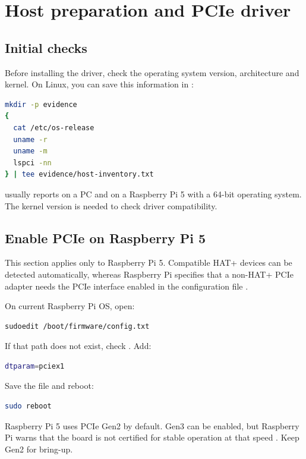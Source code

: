 \chapter{Host preparation and PCIe driver}
\label{chap:host-driver}

\section{Initial checks}

Before installing the driver, check the operating system version, architecture and
kernel. On Linux, you can save this information in :

\begin{lstlisting}[language=bash]
mkdir -p evidence
{
  cat /etc/os-release
  uname -r
  uname -m
  lspci -nn
} | tee evidence/host-inventory.txt
\end{lstlisting}

 usually reports  on a PC and  on a
Raspberry Pi 5 with a 64-bit operating system. The kernel version is needed to check
driver compatibility.

\section{Enable PCIe on Raspberry Pi 5}

This section applies only to Raspberry Pi 5. Compatible HAT+ devices can be detected
automatically, whereas Raspberry Pi specifies that a non-HAT+ PCIe adapter needs the
PCIe interface enabled in the configuration file \cite{rpi_pcie}.

On current Raspberry Pi OS, open:

\begin{lstlisting}[language=bash]
sudoedit /boot/firmware/config.txt
\end{lstlisting}

If that path does not exist, check . Add:

\begin{lstlisting}[language=bash]
dtparam=pciex1
\end{lstlisting}

Save the file and reboot:

\begin{lstlisting}[language=bash]
sudo reboot
\end{lstlisting}

Raspberry Pi 5 uses PCIe Gen2 by default. Gen3 can be enabled, but Raspberry Pi warns
that the board is not certified for stable operation at that speed \cite{rpi_pcie}.
Keep Gen2 for bring-up.

